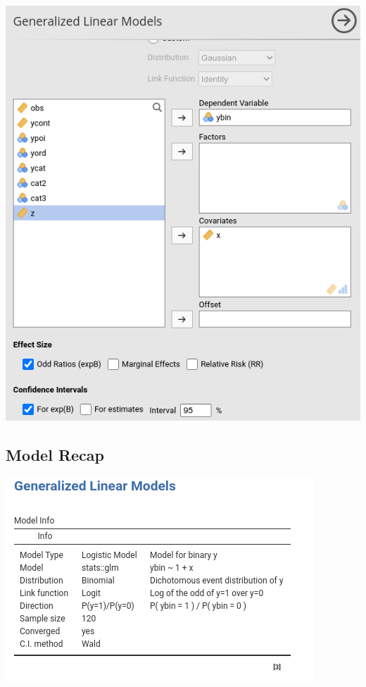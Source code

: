 \documentclass[
]{book}
\begin{document}
\includegraphics{bookletpics/3_logistic_input2.png}

\hypertarget{logisticrecap}{%
\subsection{Model Recap}\label{logisticrecap}}

\includegraphics[width=0.9\linewidth]{bookletpics/3_logistic_output1}
\end{document}
